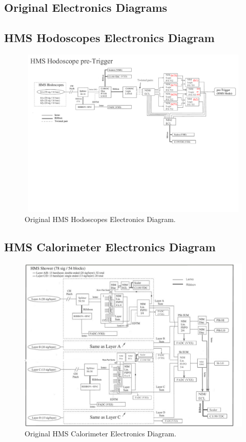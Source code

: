 \documentclass[11pt]{article}
\begin{document}
\newpage
\begin{appendices}
\appendix
\section{Original Electronics Diagrams}
\subsection{HMS Hodoscopes Electronics Diagram}
\label{appendix:AppxA1}
\begin{figure}[h!]
  \centering
  \includegraphics[width=7.0in, height=3.2in]{images/HMS_HODO_TRIGGER.pdf}
  \caption{Original HMS Hodoscopes Electronics Diagram.}
  \label{fig:hms_hod_trg}
\end{figure}
\subsection{HMS Calorimeter Electronics Diagram}
\label{appendix:AppxA2}
\begin{figure}[h!]
  \centering
  \includegraphics[width=6.in, height=4.in]{images/HMS_Cal_Trigger.pdf}
  \caption{Original HMS Calorimeter Electronics Diagram.}
  \label{fig:hms_cal_trg}
\end{figure}


\end{appendices}
\end{document}
